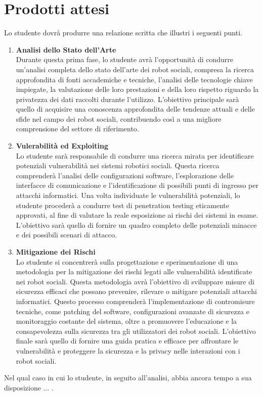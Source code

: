 \section*{Prodotti attesi}
Lo studente dovrà produrre una relazione scritta che illustri i seguenti punti.
\begin{enumerate}
    \item \textbf{Analisi dello Stato dell'Arte} \\
    Durante questa prima fase, lo studente avrà l'opportunità di condurre un'analisi completa dello stato dell'arte dei robot sociali, compresa la ricerca approfondita di fonti accademiche e tecniche, l'analisi delle tecnologie chiave impiegate, la valutazione delle loro prestazioni e della loro rispetto riguardo la privatezza dei dati raccolti durante l'utilizzo. L'obiettivo principale sarà quello di acquisire una conoscenza approfondita delle tendenze attuali e delle sfide nel campo dei robot sociali, contribuendo così a una migliore comprensione del settore di riferimento.
    
    \item \textbf{Vulerabilità ed Exploiting} \\
    Lo studente sarà responsabile di condurre una ricerca mirata per identificare potenziali vulnerabilità nei sistemi robotici sociali. Questa ricerca comprenderà l'analisi delle configurazioni software, l'esplorazione delle interfacce di comunicazione e l'identificazione di possibili punti di ingresso per attacchi informatici. Una volta individuate le vulnerabilità potenziali, lo studente procederà a condurre test di penetration testing eticamente approvati, al fine di valutare la reale esposizione ai rischi dei sistemi in esame. L'obiettivo sarà quello di fornire un quadro completo delle potenziali minacce e dei possibili scenari di attacco.
    
    \item \textbf{Mitigazione dei Rischi} \\
    Lo studente si concentrerà sulla progettazione e sperimentazione di una metodologia per la mitigazione dei rischi legati alle vulnerabilità identificate nei robot sociali. Questa metodologia avrà l'obiettivo di sviluppare misure di sicurezza efficaci che possano prevenire, rilevare o mitigare potenziali attacchi informatici. Questo processo comprenderà l'implementazione di contromisure tecniche, come patching del software, configurazioni avanzate di sicurezza e monitoraggio costante del sistema, oltre a promuovere l'educazione e la consapevolezza sulla sicurezza tra gli utilizzatori dei robot sociali. L'obiettivo finale sarà quello di fornire una guida pratica e efficace per affrontare le vulnerabilità e proteggere la sicurezza e la privacy nelle interazioni con i robot sociali.
\end{enumerate}

Nel qual caso in cui lo studente, in seguito all'analisi, abbia ancora tempo a sua disposizione ... .
